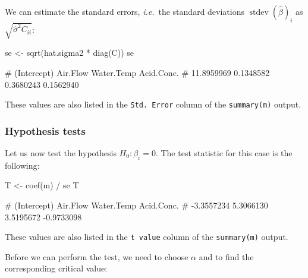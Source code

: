 \documentclass[
  a4paper,
]{article}
\newenvironment{Shaded}{\begin{snugshade}}{\end{snugshade}}
\newcommand{\FunctionTok}[1]{\textcolor[rgb]{0.00,0.00,0.00}{#1}}
\newcommand{\NormalTok}[1]{#1}
\newcommand{\OtherTok}[1]{\textcolor[rgb]{0.56,0.35,0.01}{#1}}
\newcommand{\SpecialCharTok}[1]{\textcolor[rgb]{0.00,0.00,0.00}{#1}}
\theoremstyle{definition}
\theoremstyle{definition}
\theoremstyle{definition}
\theoremstyle{definition}
\theoremstyle{remark}
\begin{document}
We can estimate the standard errors, \emph{i.e.}~the standard deviations
\(\mathop{\mathrm{stdev}}(\hat\beta)_i\) as \(\sqrt{\hat\sigma^2 C_{ii}}\):

\begin{Shaded}
\begin{Highlighting}[]
\NormalTok{se }\OtherTok{\textless{}{-}} \FunctionTok{sqrt}\NormalTok{(hat.sigma2 }\SpecialCharTok{*} \FunctionTok{diag}\NormalTok{(C))}
\NormalTok{se}
\end{Highlighting}
\end{Shaded}

\begin{Shaded}
\begin{Highlighting}[]
\NormalTok{\# (Intercept)    Air.Flow  Water.Temp  Acid.Conc. }
\NormalTok{\#  11.8959969   0.1348582   0.3680243   0.1562940}
\end{Highlighting}
\end{Shaded}

These values are also listed in the \texttt{Std.\ Error} column of the \texttt{summary(m)}
output.

\hypertarget{hypothesis-tests}{%
\subsubsection{Hypothesis tests}\label{hypothesis-tests}}

Let us now test the hypothesis \(H_0\colon \beta_i = 0\). The test statistic
for this case is the following:

\begin{Shaded}
\begin{Highlighting}[]
\NormalTok{T }\OtherTok{\textless{}{-}} \FunctionTok{coef}\NormalTok{(m) }\SpecialCharTok{/}\NormalTok{ se}
\NormalTok{T}
\end{Highlighting}
\end{Shaded}

\begin{Shaded}
\begin{Highlighting}[]
\NormalTok{\# (Intercept)    Air.Flow  Water.Temp  Acid.Conc. }
\NormalTok{\#  {-}3.3557234   5.3066130   3.5195672  {-}0.9733098}
\end{Highlighting}
\end{Shaded}

These values are also listed in the \texttt{t\ value} column of the \texttt{summary(m)}
output.

Before we can perform the test, we need to choose \(\alpha\) and to
find the corresponding critical value:
\end{document}
